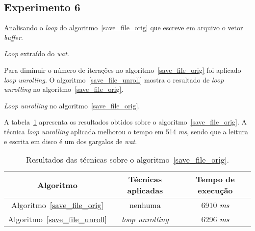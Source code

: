 \subsection{Experimento 6}

Analisando o \textit{loop} do algoritmo~\ref{save_file_orig} que escreve em arquivo o 
vetor \textit{buffer}.

\begin{algorithm}[H]
  \caption{\textit{Loop} extraído do \textit{wat}.}
\label{save_file_orig}

\end{algorithm}

Para diminuir o número de iterações no algoritmo~\ref{save_file_orig} foi
aplicado \textit{loop unrolling}. O algoritmo~\ref{save_file_unroll} mostra o
resultado de \textit{loop unrolling} no algoritmo~\ref{save_file_orig}.

\begin{algorithm}[H]
  \caption{\textit{Loop unrolling} no algoritmo~\ref{save_file_orig}.}
\label{save_file_unroll}

\end{algorithm}

A tabela~\ref{tabela_save_file} apresenta os resultados obtidos sobre o
algoritmo~\ref{save_file_orig}. 
A técnica \textit{loop unrolling} aplicada melhorou o tempo em 514 \textit{ms},
sendo que a leitura e escrita em disco é um dos gargalos de \textit{wat}.

\begin{table}[H]
  \caption{Resultados das técnicas sobre o algoritmo~\ref{save_file_orig}.}
  \label{tabela_save_file}
\begin{center}
  \begin{tabular}{c|c|c}
    Algoritmo & Técnicas aplicadas & Tempo de execução\\
    \hline
    Algoritmo~\ref{save_file_orig} & nenhuma & 6910 \textit{ms} \\
    \hline
    Algoritmo~\ref{save_file_unroll} & \textit{loop unrolling} & 6296 \textit{ms} \\
    \hline
  \end{tabular}
\end{center}
\end{table}



%

